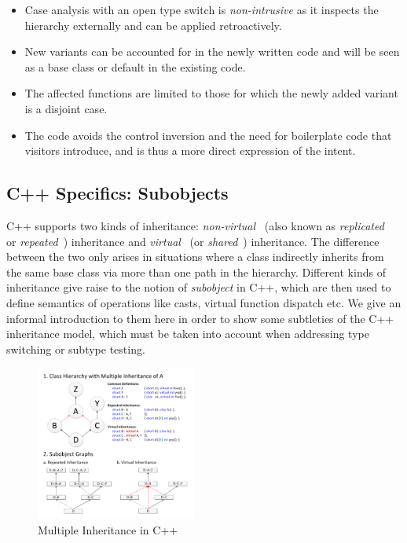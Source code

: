 \begin{itemize}
\setlength{\itemsep}{0pt}
\setlength{\parskip}{0pt}
\item Case analysis with an open type switch is \emph{non-intrusive} as it 
      inspects the hierarchy externally and can be applied retroactively. 
\item New variants can be accounted for in the newly written code and will be 
      seen as a base class or default in the existing code.
\item The affected functions are limited to those for which the newly added 
      variant is a disjoint case.
\item The code avoids the control inversion and the need for boilerplate code 
      that visitors introduce, and is thus a more direct expression of the 
      intent.
\end{itemize}

\subsection{C++ Specifics: Subobjects}
\label{sec:specifics}

C++ supports two kinds of inheritance: \emph{non-virtual}~\cite{CPPARM90} (also 
known as \emph{replicated}~\cite{RF95} or \emph{repeated}~\cite{WNST06}) 
inheritance and \emph{virtual}~\cite{CPPARM90} (or \emph{shared}~\cite{WNST06}) 
inheritance. The difference between the two only arises in situations where a 
class indirectly inherits from the same base class via more than one path in the 
hierarchy. Different kinds of inheritance give raise to the notion of 
\emph{subobject} in C++, which are then used to define semantics of operations 
like casts, virtual function dispatch etc. We give an informal introduction to 
them here in order to show some subtleties of the C++ inheritance model, which 
must be taken into account when addressing type switching or subtype testing.

\begin{figure}[htbp]
  \centering
    \includegraphics[width=0.47\textwidth]{Inheritance.pdf}
  \caption{Multiple Inheritance in C++}
  \label{fig:inheritance}
\end{figure}

